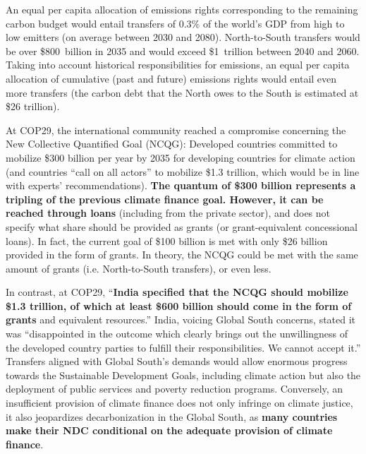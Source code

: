 \documentclass[12pt,english]{article}
\begin{document}
An equal per capita allocation of emissions rights corresponding to the remaining carbon budget would entail transfers of 0.3\% of the world's GDP from high to low emitters (on average between 2030 and 2080). North-to-South transfers would be over \$800~billion in 2035 and would exceed \$1~trillion between 2040 and 2060. 
Taking into account historical responsibilities for emissions, an equal per capita allocation of cumulative (past and future) emissions rights would entail even more transfers (the carbon debt that the North owes to the South is estimated at \$26 trillion\cite{fabre_global_2024,fanning_compensation_2023}). 

At COP29, the international community reached a compromise concerning the New Collective Quantified Goal (NCQG): Developed countries committed to mobilize \$300 billion per year by 2035 for developing countries for climate action (and countries ``call on all actors'' to mobilize \$1.3 trillion, which would be in line with experts' recommendations\cite{unfccc_new_2024,songwe_raising_2024}). \textbf{The quantum of \$300 billion represents a tripling of the previous climate finance goal. However, it can be reached through loans} (including from the private sector), and does not specify what share should be provided as grants (or grant-equivalent concessional loans). In fact, the current goal of \$100 billion is met with only \$26 billion provided in the form of grants.\cite{oecd_climate_2024} 
In theory, the NCQG could be met with the same amount of grants (i.e. North-to-South transfers), or even less. 

In contrast, at COP29, ``\textbf{India specified that the NCQG should mobilize \$1.3 trillion, of which at least \$600 billion should come in the form of grants} and equivalent resources.''\cite{earth_negotiations_bulletin_daily_2024} India, voicing Global South concerns, stated it was ``disappointed in the outcome which clearly brings out the unwillingness of the developed country parties to fulfill their responsibilities. We cannot accept it.'' Transfers aligned with Global South's demands would allow enormous progress towards the Sustainable Development Goals, including climate action but also the deployment of public services and poverty reduction programs. Conversely, an insufficient provision of climate finance does not only infringe on climate justice, it also jeopardizes decarbonization in the Global South, as \textbf{many countries make their NDC conditional on the adequate provision of climate finance}. 
\end{document}
